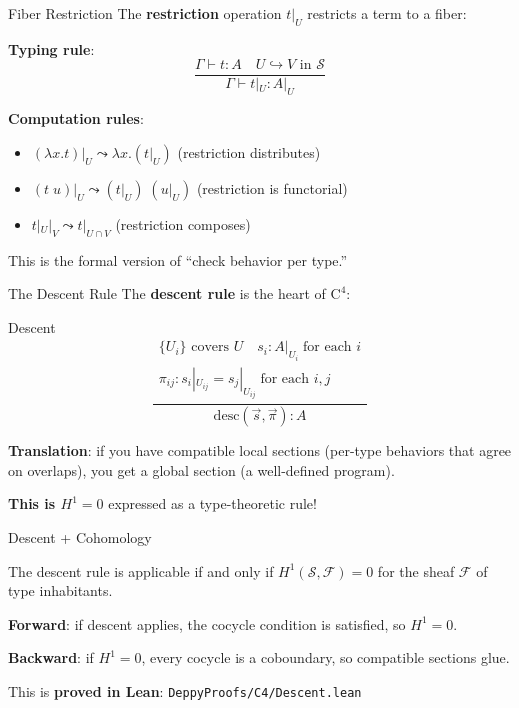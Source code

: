 \documentclass[aspectratio=169,11pt]{beamer}
\newcommand{\Cfour}{\mathrm{C}^4}
\newcommand{\site}{\mathcal{S}}
\begin{document}
\begin{frame}{Fiber Restriction}
The \textbf{restriction} operation $t|_U$ restricts a term to a fiber:

\vspace{0.5em}
\textbf{Typing rule}:
\[
\frac{\Gamma \vdash t : A \quad U \hookrightarrow V \text{ in } \site}{\Gamma \vdash t|_U : A|_U}
\]

\vspace{0.5em}
\textbf{Computation rules}:
\begin{itemize}
\item $(\lambda x.t)|_U \leadsto \lambda x.(t|_U)$ \quad (restriction distributes)
\item $(t\;u)|_U \leadsto (t|_U)\;(u|_U)$ \quad (restriction is functorial)
\item $t|_U|_V \leadsto t|_{U \cap V}$ \quad (restriction composes)
\end{itemize}

\vspace{0.3em}
This is the formal version of ``check behavior per type.''
\end{frame}

\begin{frame}{The Descent Rule}
The \textbf{descent rule} is the heart of $\Cfour$:

\begin{block}{Descent}
\[
\frac{
\begin{array}{c}
\{U_i\} \text{ covers } U \quad
s_i : A|_{U_i} \;\text{for each } i \\
\pi_{ij} : s_i|_{U_{ij}} = s_j|_{U_{ij}} \;\text{for each } i,j
\end{array}
}{
\mathrm{desc}(\vec{s}, \vec{\pi}) : A
}
\]
\end{block}

\vspace{0.3em}
\textbf{Translation}: if you have compatible local sections (per-type behaviors that agree on overlaps), you get a global section (a well-defined program).

\vspace{0.3em}
\textbf{This is $H^1 = 0$} expressed as a type-theoretic rule!
\end{frame}

\begin{frame}{Descent + Cohomology}
\begin{theorem}[Descent $\iff$ $H^1 = 0$]
The descent rule is applicable if and only if $H^1(\site, \mathcal{F}) = 0$ for the sheaf $\mathcal{F}$ of type inhabitants.
\end{theorem}

\vspace{0.5em}
\textbf{Forward}: if descent applies, the cocycle condition is satisfied, so $H^1 = 0$.

\vspace{0.3em}
\textbf{Backward}: if $H^1 = 0$, every cocycle is a coboundary, so compatible sections glue.

\vspace{0.5em}
This is \textbf{proved in Lean}: \texttt{DeppyProofs/C4/Descent.lean}
\end{frame}
\end{document}
